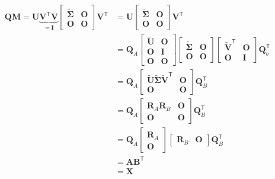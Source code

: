\documentclass{article}
\newcommand\tr{\mathsf{T}}
\begin{document}
\begin{align*}
    \mathbf{Q}\mathbf{M} = \mathbf{U}\underbrace{\mathbf{V}^{\tr} \mathbf{V}}_{=\mathbf{I}}\begin{bmatrix}
        \mathbf{\tilde{\Sigma}} &\mathbf{O} \\
        \mathbf{O} & \mathbf{O}
    \end{bmatrix}\mathbf{V}^{\tr} &= \mathbf{U}\begin{bmatrix}
        \mathbf{\tilde{\Sigma}} &\mathbf{O} \\
        \mathbf{O} & \mathbf{O}
    \end{bmatrix}\mathbf{V}^{\tr} \\
    &=\mathbf{Q}_{A} \begin{bmatrix}
        \mathbf{\tilde{U}} & \mathbf{O} \\
        \mathbf{O} & \mathbf{I} \\
        \mathbf{O} & \mathbf{O}
    \end{bmatrix}\begin{bmatrix}
        \mathbf{\tilde{\Sigma}} & \mathbf{O} \\
        \mathbf{O} & \mathbf{O}
    \end{bmatrix}\begin{bmatrix}
        \mathbf{\tilde{V}}^{\tr} & \mathbf{O} \\
        \mathbf{O} & \mathbf{I}
    \end{bmatrix}\mathbf{Q}_{b}^{\tr} \\
    &=  \mathbf{Q}_{A}
    \begin{bmatrix}
        \mathbf{\tilde{U}}\mathbf{\tilde{\Sigma}}\mathbf{\tilde{V}}^{\tr}   & \mathbf{O} \\
        \mathbf{O} & \mathbf{O}
    \end{bmatrix}
    \mathbf{Q}_{B}^{\tr} \\
    &=  \mathbf{Q}_{A}
    \begin{bmatrix}
        \mathbf{R}_{A}\mathbf{R}_{B} & \mathbf{O} \\
        \mathbf{O} & \mathbf{O}
    \end{bmatrix}
    \mathbf{Q}_{B}^{\tr} \\
    &= \mathbf{Q}_{A}\begin{bmatrix}
    \mathbf{R}_{A}\\
    \mathbf{O}
    \end{bmatrix}
    \begin{bmatrix}
    \mathbf{R}_{B} & \mathbf{O}
    \end{bmatrix}\mathbf{Q}_{B}^{\mathsf{T}} \\
    &= \mathbf{A}\mathbf{B}^{\tr} \\
    &= \mathbf{X}
\end{align*}
\end{document}
